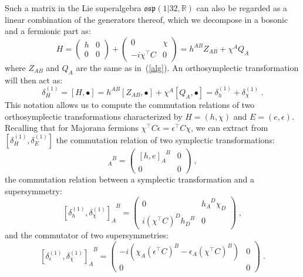 \documentclass[a4paper,11pt]{article}
\begin{document}
Such a matrix in the Lie superalgebra $\mathfrak{osp}(1|32,\mathbb{R})$ can
also be regarded as a linear combination of the generators thereof, which
we decompose in a bosonic and a fermionic part as:
\begin{equation}
H = 
\begin{pmatrix}
h & 0 \\
0 & 0 
\end{pmatrix}+
\begin{pmatrix}
0 & \chi \\
-i \chi^{\top} C & 0 
\end{pmatrix}
=h^{AB} Z_{AB} + \chi^A Q_A 
\end{equation}
where $Z_{AB}$ and $Q_A$ are the same as in~(\ref{alg}).
An orthosymplectic transformation will then act as:
\begin{equation}
\delta_H^{(1)} = 
[H,\bullet] = h^{AB} [Z_{AB},\bullet ] + \chi^A [Q_A,\bullet] =
\delta_{h}^{(1)} + \delta_{\chi}^{(1)}\; .
\end{equation}
This notation allows us to compute the commutation relations of two
orthosymplectic transformations characterized by $H=(h,\chi)$ and 
$E=(e,\epsilon)$. Recalling that for Majorana fermions $\chi^{\top} C \epsilon =\epsilon^{\top} C \chi$, 
we can extract from 
$[\delta_H^{(1)},\delta_E^{(1)}]$ the commutation relation of two symplectic
transformations:
\begin{equation}
[\delta_h^{(1)},\delta_e^{(1)}]_A^{\phantom{A}B} =
\begin{pmatrix}
[h,e]_A^{\phantom{A}B}  & 0 \\
0 & 0 
\end{pmatrix} \;,
\end{equation} 
the commutation relation between a symplectic transformation and
a supersymmetry:
\begin{equation}\label{com:rs}
[\delta_h^{(1)},\delta_\chi^{(1)}]_A^{\phantom{A}B} =
\begin{pmatrix}
0 & h_A^{\phantom{A}D} \chi_D \\
i (\chi^{\top} C)^D h_D^{\phantom{D}B} & 0
\end{pmatrix} \;,
\end{equation}
and the commutator of two supersymmetries:
\begin{equation}\label{com:ss}
[\delta_\epsilon^{(1)},\delta_\chi^{(1)}]_A^{\phantom{A}B} =
\begin{pmatrix}
-i(\chi_A (\epsilon^{\top} C)^B - \epsilon_A
(\chi^{\top} C)^B) & 0 \\
0 &  0
\end{pmatrix} \;.
\end{equation}
\end{document}
